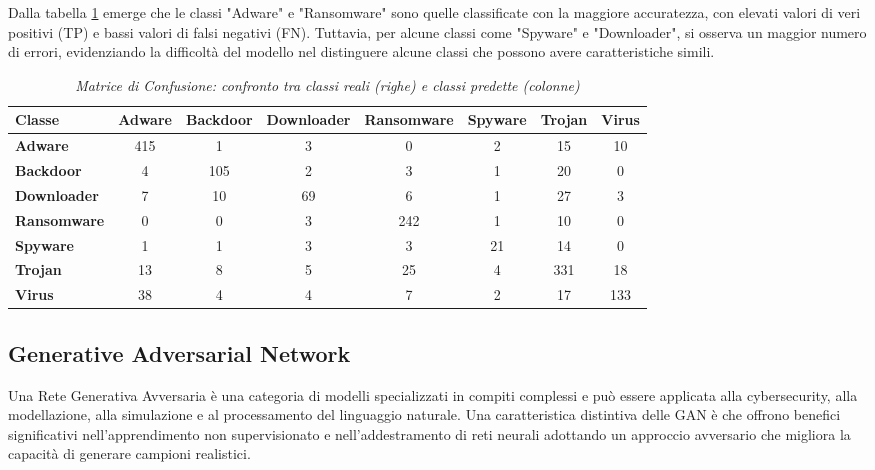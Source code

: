 Dalla tabella \ref{tab:confusion_matrix} emerge che le classi "Adware" e "Ransomware" sono quelle classificate con la maggiore accuratezza, con elevati valori di veri positivi (TP) e bassi valori di falsi negativi (FN). Tuttavia, per alcune classi come "Spyware" e "Downloader", si osserva un maggior numero di errori, evidenziando la difficoltà del modello nel distinguere alcune classi che possono avere caratteristiche simili.
\begin{table}[ht]
    \centering
    \hspace*{-2cm} 
    \begin{tabular}{@{}|l|c|c|c|c|c|c|c|@{}}
    \toprule
    \textbf{Classe}      & \textbf{Adware} & \textbf{Backdoor} & \textbf{Downloader} & \textbf{Ransomware} & \textbf{Spyware} & \textbf{Trojan} & \textbf{Virus} \\ \midrule
    \textbf{Adware}      & 415 & 1   & 3   & 0   & 2   & 15  & 10  \\\midrule
    \textbf{Backdoor}    & 4   & 105 & 2   & 3   & 1   & 20  & 0   \\\midrule
    \textbf{Downloader}  & 7   & 10  & 69  & 6   & 1   & 27  & 3   \\\midrule
    \textbf{Ransomware}  & 0   & 0   & 3   & 242 & 1   & 10  & 0   \\\midrule
    \textbf{Spyware}     & 1   & 1   & 3   & 3   & 21  & 14  & 0   \\\midrule
    \textbf{Trojan}      & 13  & 8   & 5   & 25  & 4   & 331 & 18  \\\midrule
    \textbf{Virus}       & 38  & 4   & 4   & 7   & 2   & 17  & 133 \\\bottomrule
    \end{tabular}
    \vspace{.2cm}
    \caption{\emph{Matrice di Confusione: confronto tra classi reali (righe) e classi predette (colonne)}}
    \label{tab:confusion_matrix}
\end{table}
    
\newpage
\subsection{Generative Adversarial Network}
Una Rete Generativa Avversaria è una categoria di modelli specializzati in compiti complessi e può essere applicata alla cybersecurity, alla modellazione, alla simulazione e al processamento del linguaggio naturale. Una caratteristica distintiva delle GAN è che offrono benefici significativi nell'apprendimento non supervisionato e nell'addestramento di reti neurali adottando un approccio avversario che migliora la capacità di generare campioni realistici.

